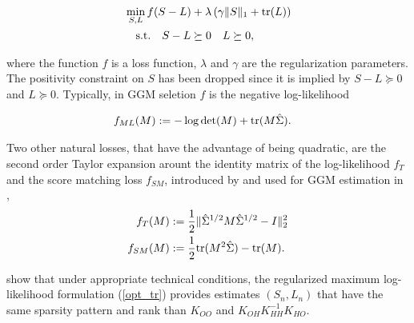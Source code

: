 \begin{align}
\label{opt_tr}
&\min_{S,L} f(S-L)+\lambda\left(\gamma\|S\|_{1}+ {\rm tr}(L)\right) \\
&\quad \text{s.t.} \quad S-L \succeq 0 \quad L \succeq 0, \nonumber
\end{align}

where the function $f$ is a loss function, $\lambda$ and $\gamma$ are the regularization parameters. The positivity constraint on $S$ has been dropped since it is implied by $S-L \succeq 0$ and $L \succeq 0$. Typically, in GGM seletion $f$ is the negative log-likelihood

\begin{align}
f_{ML}(M)&:=-\log\det(M) + {\rm tr}(M\hat{\Sigma}).
\end{align}

 
Two other natural losses, that have the advantage of being quadratic, are the second order Taylor expansion arount the identity matrix of the log-likelihood $f_{T}$ and the score matching loss $f_{SM}$, introduced by \citet{hyvarinen2005estimation} and used for GGM estimation in \citet{lin2016estimation},
\begin{align}
f_{T}(M)&:=\frac{1}{2}\|\hat{\Sigma}^{1/2}M\hat{\Sigma}^{1/2}-I\|_2^2\\
f_{SM}(M)&:=\frac{1}{2}{\rm tr}(M^2 \hat{\Sigma})-{\rm tr}(M).
\end{align}

\citet{chandrasekaran2010} show that under appropriate technical conditions, the regularized maximum log-likelihood formulation (\ref{opt_tr}) provides estimates $(S_{n},L_{n})$ that have the same sparsity pattern and rank than $K_{OO}$ and $K_{OH}K_{HH}^{-1}K_{HO}$. 

%
%


